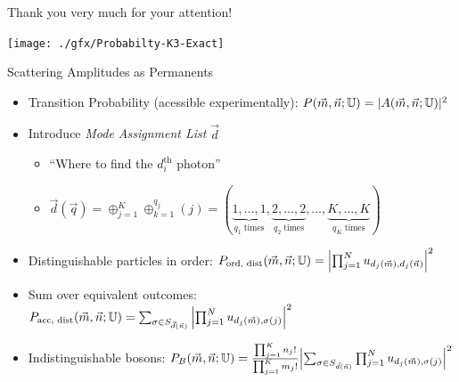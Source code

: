 
\begin{frame}{Thank you very much for your attention!}
%
\begin{center}
	\texttt{[image: ./gfx/Probabilty-K3-Exact]}
\end{center}
%
\end{frame}


\setcounter{framenumber}{0}
\begin{frame}{Scattering Amplitudes as Permanents}
%
\begin{itemize}
\item Transition Probability (acessible experimentally):
	$P(\vec{m}, \vec{n}; \mathbb{U}) = |A(\vec{m}, \vec{n}; \mathbb{U})|^2$
\item Introduce \emph{Mode Assignment List} $\vec{d}$
	\begin{itemize}
	\item \enquote{Where to find the $d_i^{\text{th}}$ photon}
	\item 
		$\vec{d}(\vec{q}) = \oplus_{j=1}^{K} \oplus_{k=1}^{q_j}(j)
		= (
			\underbrace{1, \ldots, 1}_{q_1\;\text{times}},
			\underbrace{2, \ldots, 2}_{q_2\;\text{times}}, 
			\ldots, 
			\underbrace{K, \ldots, K}_{q_K\;\text{times}}
		  )$
	\end{itemize}
\item Distinguishable particles in order:
	\tabto{1.6cm}
	$P_{\text{ord, dist}}(\vec{m}, \vec{n}; \mathbb{U})
=
	\qty|
		\prod_{j=1}^N
			u_{d_j(\vec{m}), d_j(\vec{n})}
	|^2$
\item Sum over equivalent outcomes:
	\tabto{1.6cm}
	$P_{\text{acc, dist}}(\vec{m}, \vec{n}; \mathbb{U})
= 
	\sum_{\sigma \in S_{\vec{d}(\vec{n})}}
	\qty|
		\prod_{j=1}^N
			u_{d_j(\vec{m}), \sigma(j)}
	|^2$
\item Indistinguishable bosons:
	\tabto{1.6cm}
	$P_B(\vec{m}, \vec{n}; \mathbb{U})
=
	\frac
		{\prod_{j=1}^K n_j!}
		{\prod_{j=1}^K m_j!}
	\qty|
		\sum_{\sigma \in S_{\vec{d}(\vec{n})}}
		\prod_{j=1}^N
			u_{d_j(\vec{m}), \sigma(j)}
	|^2$
\end{itemize}
%
\end{frame}


